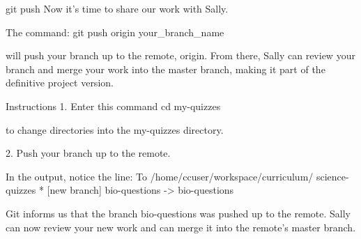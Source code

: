 git push
    Now it’s time to share our work with Sally.

    The command:
        git push origin your_branch_name
    
    will push your branch up to the remote, origin. From there, Sally can review your branch and merge your work into the master branch, making it part of the definitive project version.

Instructions
    1.
    Enter this command
        cd my-quizzes
    
    to change directories into the my-quizzes directory.

    2.
    Push your branch up to the remote.

    In the output, notice the line:
        To /home/ccuser/workspace/curriculum/   science-quizzes
        * [new branch]      bio-questions -> bio-questions
    
    Git informs us that the branch bio-questions was pushed up to the remote. Sally can now review your new work and can merge it into the remote’s master branch.